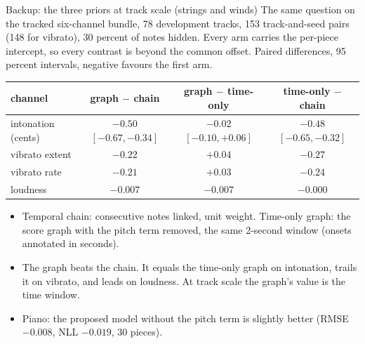\documentclass[aspectratio=169,11pt]{beamer}
\begin{document}
\begin{frame}{Backup: the three priors at track scale (strings and winds)}
  \small
  The same question on the tracked six-channel bundle, 78 development
  tracks, 153 track-and-seed pairs (148 for vibrato), 30 percent of notes
  hidden. Every arm carries the per-piece intercept, so every contrast is beyond the
  common offset. Paired differences, 95 percent intervals, negative
  favours the first arm.
  \vspace{1mm}
  \begin{center}
  \scriptsize
  \setlength{\tabcolsep}{4pt}
  \begin{tabular}{@{}lccc@{}}
    \toprule
    channel & graph $-$ chain & graph $-$ time-only & time-only $-$ chain \\
    \midrule
    intonation (cents) & $-0.50$ $[-0.67, -0.34]$ & $-0.02$ $[-0.10, +0.06]$ & $-0.48$ $[-0.65, -0.32]$ \\
    vibrato extent & $-0.22$ & $+0.04$ & $-0.27$ \\
    vibrato rate & $-0.21$ & $+0.03$ & $-0.24$ \\
    loudness & $-0.007$ & $-0.007$ & $-0.000$ \\
    \bottomrule
  \end{tabular}
  \end{center}
  \vspace{1mm}
  \begin{itemize}
    \item Temporal chain: consecutive notes linked, unit weight.
          Time-only graph: the score graph with the pitch term removed,
          the same 2-second window (onsets annotated in seconds).
    \item The graph beats the chain. It equals the time-only graph on
          intonation, trails it on vibrato, and leads on loudness. At
          track scale the graph's value is the time window.
    \item Piano: the proposed model without the pitch term is slightly
          better (RMSE $-0.008$, NLL $-0.019$, 30 pieces).
  \end{itemize}
\end{frame}
\end{document}
